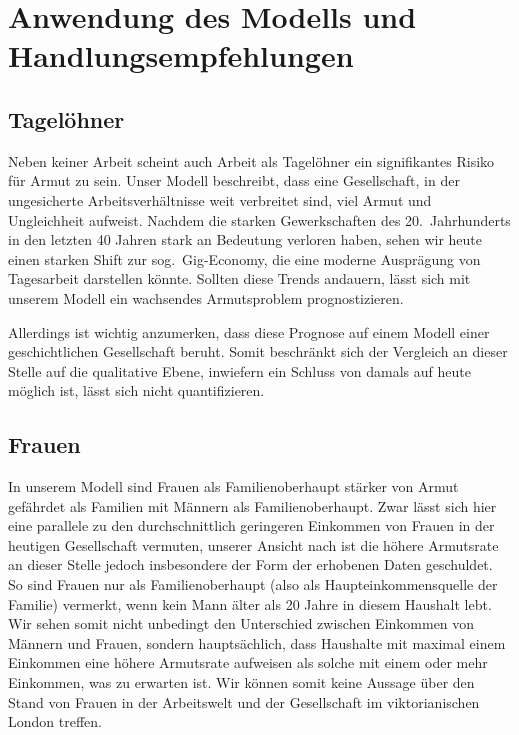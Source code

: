 \chapter{Anwendung des Modells und Handlungsempfehlungen}
\label{ch:handlungsempfehlungen}
\section*{Tagelöhner}
Neben keiner Arbeit scheint auch Arbeit als Tagelöhner ein signifikantes Risiko für Armut zu sein.
Unser Modell beschreibt, dass eine Gesellschaft, in der ungesicherte Arbeitsverhältnisse weit verbreitet sind, viel Armut und Ungleichheit aufweist.
Nachdem die starken Gewerkschaften des 20.\ Jahrhunderts in den letzten 40 Jahren stark an Bedeutung verloren haben, sehen
wir heute einen starken Shift zur sog.\ Gig-Economy, die eine moderne Ausprägung von Tagesarbeit darstellen könnte.
Sollten diese Trends andauern, lässt sich mit unserem Modell ein wachsendes Armutsproblem prognostizieren.

Allerdings ist wichtig anzumerken, dass diese Prognose auf einem Modell einer geschichtlichen Gesellschaft beruht.
Somit beschränkt sich der Vergleich an dieser Stelle auf die qualitative Ebene,
inwiefern ein Schluss von damals auf heute möglich ist, lässt sich nicht quantifizieren.

\section*{Frauen}
In unserem Modell sind Frauen als Familienoberhaupt stärker von Armut gefährdet als Familien mit Männern als Familienoberhaupt.
Zwar lässt sich hier eine parallele zu den durchschnittlich geringeren Einkommen von Frauen in der heutigen Gesellschaft vermuten,
unserer Ansicht nach ist die höhere Armutsrate an dieser Stelle jedoch insbesondere der Form der erhobenen Daten geschuldet.
So sind Frauen nur als Familienoberhaupt (also als Haupteinkommensquelle der Familie) vermerkt, wenn kein Mann älter als 20 Jahre in diesem Haushalt lebt.
Wir sehen somit nicht unbedingt den Unterschied zwischen Einkommen von Männern und Frauen, sondern hauptsächlich, dass Haushalte mit maximal einem Einkommen
eine höhere Armutsrate aufweisen als solche mit einem oder mehr Einkommen, was zu erwarten ist.
Wir können somit keine Aussage über den Stand von Frauen in der Arbeitswelt und der Gesellschaft im viktorianischen London treffen.

